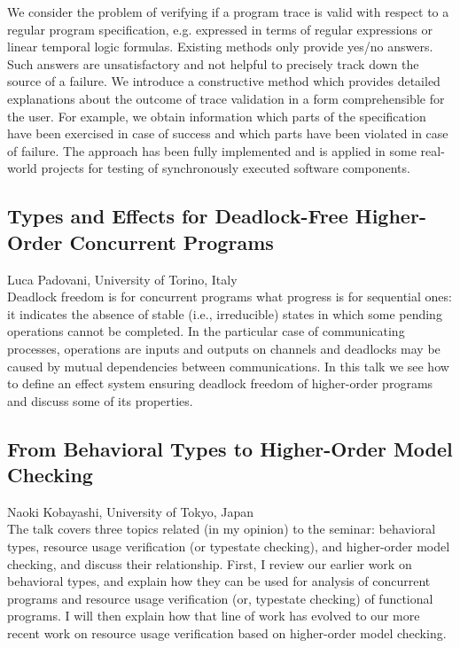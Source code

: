 \documentclass[11pt]{article}
\begin{document}
We consider the problem of verifying if a program trace is valid with
respect to a regular program specification, e.g. expressed in terms of
regular expressions or linear temporal logic formulas. Existing
methods only provide yes/no answers. Such answers are unsatisfactory
and not helpful to precisely track down the source of a failure. We
introduce a constructive method which provides detailed explanations
about the outcome of trace validation in a form comprehensible for the
user. For example, we obtain information which parts of the
specification have been exercised in case of success and which parts
have been violated in case of failure. The approach has been fully
implemented and is applied in some real-world projects for testing of
synchronously executed software components.

\subsection*{Types and Effects for Deadlock-Free Higher-Order Concurrent Programs}
\noindent Luca Padovani, University of Torino, Italy \\[0.5ex]

Deadlock freedom is for concurrent programs what progress is for
sequential ones: it indicates the absence of stable (i.e.,
irreducible) states in which some pending operations cannot be
completed. In the particular case of communicating processes,
operations are inputs and outputs on channels and deadlocks may be
caused by mutual dependencies between communications. In this talk we
see how to define an effect system ensuring deadlock freedom of
higher-order programs and discuss some of its properties.

\subsection*{From Behavioral Types to Higher-Order Model Checking}
\noindent Naoki Kobayashi, University of Tokyo, Japan \\[0.5ex]

The talk covers three topics related (in my opinion) to the seminar:
behavioral types, resource usage verification (or typestate checking),
and higher-order model checking, and discuss their relationship.
First, I review our earlier work on behavioral types, and explain how
they can be used for analysis of concurrent programs and resource
usage verification (or, typestate checking) of functional programs.  I
will then explain how that line of work has evolved to our more recent
work on resource usage verification based on higher-order model
checking.
\end{document}

